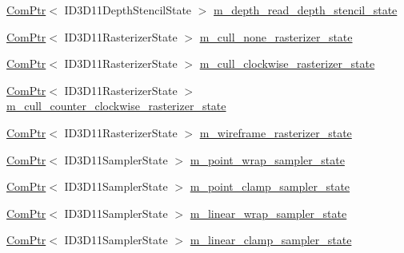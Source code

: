 \begin{DoxyCompactItemize}
\item 
\hyperlink{namespacemage_ae74f374780900893caa5555d1031fd79}{Com\+Ptr}$<$ I\+D3\+D11\+Depth\+Stencil\+State $>$ \hyperlink{structmage_1_1_rendering_state_cache_af58f7cc04ca479493902eca2b4f349bc}{m\+\_\+depth\+\_\+read\+\_\+depth\+\_\+stencil\+\_\+state}
\item 
\hyperlink{namespacemage_ae74f374780900893caa5555d1031fd79}{Com\+Ptr}$<$ I\+D3\+D11\+Rasterizer\+State $>$ \hyperlink{structmage_1_1_rendering_state_cache_a3801dbdf6386c9534123d695cbde47c7}{m\+\_\+cull\+\_\+none\+\_\+rasterizer\+\_\+state}
\item 
\hyperlink{namespacemage_ae74f374780900893caa5555d1031fd79}{Com\+Ptr}$<$ I\+D3\+D11\+Rasterizer\+State $>$ \hyperlink{structmage_1_1_rendering_state_cache_a4194ce92cb7cccd2ae219e13eaf7cfdc}{m\+\_\+cull\+\_\+clockwise\+\_\+rasterizer\+\_\+state}
\item 
\hyperlink{namespacemage_ae74f374780900893caa5555d1031fd79}{Com\+Ptr}$<$ I\+D3\+D11\+Rasterizer\+State $>$ \hyperlink{structmage_1_1_rendering_state_cache_a825b91a2cb5ab76375d1ebebe7a0ef74}{m\+\_\+cull\+\_\+counter\+\_\+clockwise\+\_\+rasterizer\+\_\+state}
\item 
\hyperlink{namespacemage_ae74f374780900893caa5555d1031fd79}{Com\+Ptr}$<$ I\+D3\+D11\+Rasterizer\+State $>$ \hyperlink{structmage_1_1_rendering_state_cache_a2fddb539c6cb42feb3c54b73ad2fe800}{m\+\_\+wireframe\+\_\+rasterizer\+\_\+state}
\item 
\hyperlink{namespacemage_ae74f374780900893caa5555d1031fd79}{Com\+Ptr}$<$ I\+D3\+D11\+Sampler\+State $>$ \hyperlink{structmage_1_1_rendering_state_cache_ae4011d6ce5effbacf3fd69ffa5d46ebc}{m\+\_\+point\+\_\+wrap\+\_\+sampler\+\_\+state}
\item 
\hyperlink{namespacemage_ae74f374780900893caa5555d1031fd79}{Com\+Ptr}$<$ I\+D3\+D11\+Sampler\+State $>$ \hyperlink{structmage_1_1_rendering_state_cache_ad53e96f5527120d6cfed5a4759dc0d41}{m\+\_\+point\+\_\+clamp\+\_\+sampler\+\_\+state}
\item 
\hyperlink{namespacemage_ae74f374780900893caa5555d1031fd79}{Com\+Ptr}$<$ I\+D3\+D11\+Sampler\+State $>$ \hyperlink{structmage_1_1_rendering_state_cache_a7f7289f3759840045dbe3dd2785199a8}{m\+\_\+linear\+\_\+wrap\+\_\+sampler\+\_\+state}
\item 
\hyperlink{namespacemage_ae74f374780900893caa5555d1031fd79}{Com\+Ptr}$<$ I\+D3\+D11\+Sampler\+State $>$ \hyperlink{structmage_1_1_rendering_state_cache_a8086db2af33ea844744f3e81a4471af6}{m\+\_\+linear\+\_\+clamp\+\_\+sampler\+\_\+state}
\item 

\end{DoxyCompactItemize}
